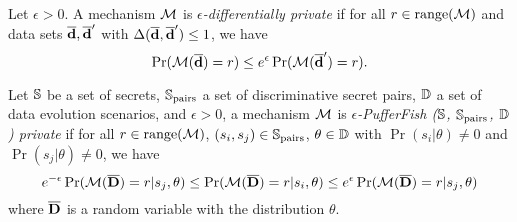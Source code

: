 
\begin{definition}
  Let $\epsilon > 0$. A mechanism $\mathcal{M}$ is
  \emph{$\epsilon$-differentially private} if for all $r \in
  \textmd{range}(\mathcal{M})$ and data sets $\overline{\mathbf{d}}, \overline{\mathbf{d}}'$ with $\Delta (\overline{\mathbf{d}},
  \overline{\mathbf{d}}') \leq 1$, we have
  \[
    \Pr (\mathcal{M} (\overline{\mathbf{d}}) = r) \leq e^{\epsilon} \Pr (\mathcal{M} (\overline{\mathbf{d}}') = r).
  \]
\end{definition}


\begin{definition}
  Let $\mathbb{S}$ be a set of secrets, $\mathbb{S}_{\textmd{pairs}}$ a set of
  discriminative secret pairs, $\mathbb{D}$ a set of data evolution
  scenarios, and $\epsilon > 0$, a mechanism $\mathcal{M}$ is
  \emph{$\epsilon$-PufferFish ($\mathbb{S}$, $\mathbb{S}_{\textmd{pairs}}$,
    $\mathbb{D}$) private} if for all $r \in \textmd{range}(\mathcal{M})$, $(s_i, s_j) \in
    \mathbb{S}_{\textmd{pairs}}$, $\theta \in \mathbb{D}$ with $\Pr (s_i |
    \theta) \neq 0$ and $\Pr (s_j | \theta) \neq 0$, we have
    \[
      e^{-\epsilon} \Pr (\mathcal{M} (\overline{\mathbf{D}}) = r | s_j, \theta) \leq
      \Pr (\mathcal{M} (\overline{\mathbf{D}}) = r | s_i, \theta) \leq
      e^\epsilon \Pr (\mathcal{M} (\overline{\mathbf{D}}) = r | s_j, \theta)
    \]
    where $\overline{\mathbf{D}}$ is a random variable with the distribution $\theta$.
\end{definition}


  